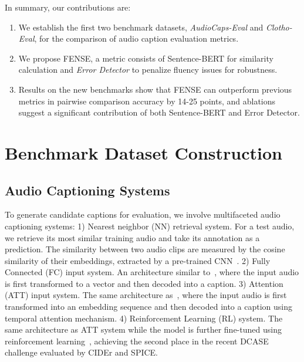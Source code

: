 \documentclass{article}
\begin{document}
In summary, our contributions are:
\begin{enumerate}
    \item We establish the first two benchmark datasets, \textit{AudioCaps-Eval} and \textit{Clotho-Eval}, for the comparison of audio caption evaluation metrics. 
    \item We propose FENSE, a metric consists of Sentence-BERT for similarity calculation and \textit{Error Detector} to penalize fluency issues for robustness.
    \item Results on the new benchmarks show that FENSE can outperform previous metrics in pairwise comparison accuracy by 14-25 points, and ablations suggest a significant contribution of both Sentence-BERT and Error Detector.
\end{enumerate}


\section{Benchmark Dataset Construction}
\label{sec:method}

\subsection{Audio Captioning Systems}
\label{ssec:caption_systems}
To generate candidate captions for evaluation, we involve multifaceted audio captioning systems: 
1) Nearest neighbor (NN) retrieval system. 
For a test audio, we retrieve its most similar training audio and take its annotation as a prediction. 
The similarity between two audio clips are measured by the cosine similarity of their embeddings, 
extracted by a pre-trained CNN~\cite{kong2020panns}.
2) Fully Connected (FC) input system.
An architecture similar to~\cite{wu2019audio}, where the input audio is first transformed to a vector and then decoded into a caption.
3) Attention (ATT) input system.
The same architecture as~\cite{xu2021sjtu}, where the input audio is first transformed into an embedding sequence and then decoded into a caption using temporal attention mechanism.
4) Reinforcement Learning (RL) system.
The same architecture as ATT system while the model is further fine-tuned using reinforcement learning~\cite{xu2021sjtu}, achieving the second place in the recent DCASE challenge evaluated by CIDEr and SPICE.
\end{document}

